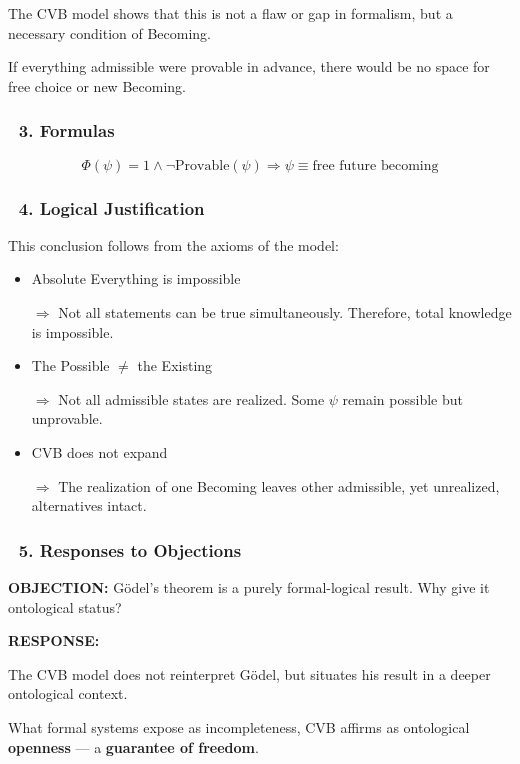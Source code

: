 \documentclass[12pt]{article}
\begin{document}
The CVB model shows that this is not a flaw or gap in formalism, but a necessary condition of Becoming.

If everything admissible were provable in advance, there would be no space for free choice or new Becoming.

\subsubsection*{🔹 3. Formulas}

\[
\Phi(\psi) = 1 \land \neg \mathrm{Provable}(\psi) \Rightarrow \psi \equiv \text{free future becoming}
\]

\subsubsection*{🔹 4. Logical Justification}

This conclusion follows from the axioms of the model:

\begin{itemize}
\item \text{[2]} Absolute Everything is impossible

$\Rightarrow$ Not all statements can be true simultaneously. Therefore, total knowledge is impossible.

\item \text{[5]} The Possible $\neq$ the Existing

$\Rightarrow$ Not all admissible states are realized. Some $\psi$ remain possible but unprovable.

\item \text{[13]} CVB does not expand

$\Rightarrow$ The realization of one Becoming leaves other admissible, yet unrealized, alternatives intact.
\end{itemize}

\subsubsection*{🔹 5. Responses to Objections}

\textbf{OBJECTION:} Gödel’s theorem is a purely formal-logical result. Why give it ontological status?

\textbf{RESPONSE:}

The CVB model does not reinterpret Gödel, but situates his result in a deeper ontological context.

What formal systems expose as incompleteness, CVB affirms as ontological \textbf{openness} — a \textbf{guarantee of freedom}.
\end{document}
